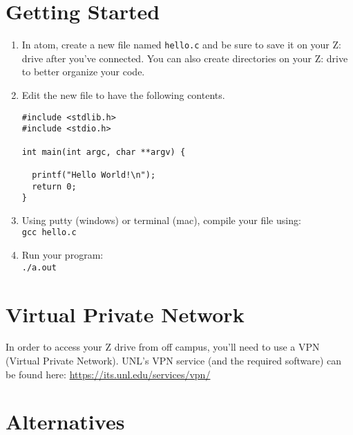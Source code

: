\documentclass[12pt]{scrartcl}
\begin{document}
\section*{Getting Started}

\begin{enumerate}
  \item In atom, create a new file named \texttt{hello.c} and be sure to 
save it on your Z: drive after you've connected.  You can also create directories
on your Z: drive to better organize your code.  
  \item Edit the new file to have the following contents.
\begin{verbatim}
#include <stdlib.h>
#include <stdio.h>

int main(int argc, char **argv) {

  printf("Hello World!\n");
  return 0;
}
\end{verbatim}
  \item Using putty (windows) or terminal (mac), compile your file using:\\
  \texttt{gcc hello.c}
  \item Run your program:\\
  \texttt{./a.out}
\end{enumerate}

\section*{Virtual Private Network}

In order to access your Z drive from off campus, you'll need to
use a VPN (Virtual Private Network).  UNL's VPN service (and the
required software) can be found here: \url{https://its.unl.edu/services/vpn/}

\section*{Alternatives}
\end{document}
